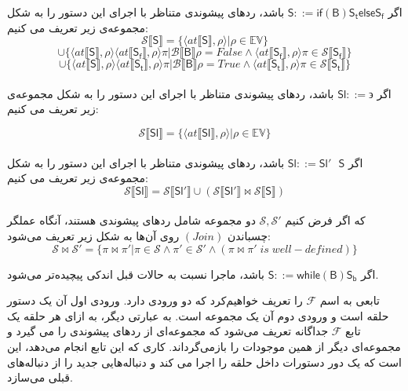\begin{defn}
	
	اگر $         \mathsf{S} ::= \mathsf{if}  \mathsf{ (B) S_t else S_f}  $ باشد، ردهای پیشوندی متناظر با اجرای این دستور را به شکل مجموعه‌ی زیر تعریف می کنیم:
	$$\mathcal{S} \llbracket\mathsf{S}\rrbracket = \{ \langle at\llbracket\mathsf{S}\rrbracket , \rho \rangle | \rho \in \mathbb{EV}       \} $$$$\cup     \{ \langle at\llbracket\mathsf{S}\rrbracket , \rho \rangle \langle at\llbracket\mathsf{S_f}\rrbracket , \rho \rangle 
	\pi | \mathcal{B}\llbracket\mathsf{B}\rrbracket \rho =False  \wedge   \langle  at\llbracket\mathsf{S_f}\rrbracket  , \rho \rangle \pi \in \mathcal{S} \llbracket\mathsf{S_f}\rrbracket    \}  
	$$$$\cup    \{ \langle at\llbracket\mathsf{S}\rrbracket , \rho \rangle \langle at\llbracket\mathsf{S_t}\rrbracket , \rho \rangle 
	\pi | \mathcal{B}\llbracket\mathsf{B}\rrbracket \rho =True  \wedge   \langle  at\llbracket\mathsf{S_t}\rrbracket  , \rho \rangle \pi \in \mathcal{S} \llbracket\mathsf{S_t}\rrbracket    \}          $$ \\
	
	
	اگر 
	$         \mathsf{Sl} ::= \backepsilon  $
	باشد، ردهای پیشوندی متناظر با اجرای این دستور را به شکل مجموعه‌ی زیر تعریف می کنیم:
	
	$$\mathcal{S} \llbracket\mathsf{Sl}\rrbracket = \{ \langle at\llbracket\mathsf{Sl}\rrbracket , \rho \rangle | \rho \in \mathbb{EV}       \}        $$ \\
	
	اگر $         \mathsf{Sl} ::= \mathsf{Sl' \:\:\: S}  $ باشد، ردهای پیشوندی متناظر با اجرای این دستور را به شکل مجموعه‌ی زیر تعریف می کنیم:
	$$\mathcal{S} \llbracket\mathsf{Sl}\rrbracket = \mathcal{S} \llbracket\mathsf{Sl'}\rrbracket \cup( \mathcal{S} \llbracket\mathsf{Sl'}\rrbracket
	\Join \mathcal{S} \llbracket\mathsf{S}\rrbracket )      $$ \\
	که اگر فرض کنیم 
	$\mathcal{S,S'}$
	دو مجموعه شامل ردهای پیشوندی هستند، آنگاه عملگر چسباندن 
	$(Join)$
	روی آن‌ها به شکل زیر تعریف می‌شود:
	$$\mathcal{S}\Join \mathcal{S}' = \{\pi \Join \pi' | \pi \in \mathcal{S}\land\pi' \in \mathcal{S}'\land (\pi \Join \pi'\;is\; well-defined) \}$$
	
	
	اگر $         \mathsf{S} ::= \mathsf{while (B)S_b }   $ باشد، ماجرا نسبت به حالات قبل اندکی پیچیده‌تر می‌شود.
	
	تابعی به اسم $\mathcal{F} $ را تعریف خواهیم‌کرد که دو ورودی دارد. ورودی اول آن یک دستور حلقه است و ورودی دوم آن یک مجموعه است. به عبارتی دیگر، به ازای هر حلقه یک تابع $\mathcal{F} $  جداگانه تعریف می‌شود که مجموعه‌ای از ردهای پیشوندی را می گیرد و مجموعه‌ای دیگر از همین موجودات را بازمی‌گرداند. کاری که این تابع انجام می‌دهد، این است که یک دور دستورات داخل حلقه را اجرا می کند و دنباله‌هایی جدید را از دنباله‌های قبلی می‌سازد. 
	

\end{defn}
